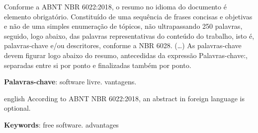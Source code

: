 \documentclass[
	article,			%
	12pt,				%
	oneside,			%
	a4paper,			%
	english,			%
	brazil,				%
	sumario=tradicional
	]{abntex2}
\begin{document}

\frenchspacing 


%
%

\imprimircapa


\imprimirfolhaderosto*





\begin{resumoumacoluna}
 Conforme a ABNT NBR 6022:2018, o resumo no idioma do documento é elemento obrigatório. 
 Constituído de uma sequência de frases concisas e objetivas e não de uma 
 simples enumeração de tópicos, não ultrapassando 250 palavras, seguido, logo 
 abaixo, das palavras representativas do conteúdo do trabalho, isto é, 
 palavras-chave e/ou descritores, conforme a NBR 6028. (\ldots) As 
 palavras-chave devem figurar logo abaixo do resumo, antecedidas da expressão 
 Palavras-chave:, separadas entre si por ponto e finalizadas também por ponto.
 
 \vspace{\onelineskip}
 
 \noindent
 \textbf{Palavras-chave}: software livre. vantagens. 
\end{resumoumacoluna}


\renewcommand{\resumoname}{Abstract}
\begin{resumoumacoluna}
 \begin{otherlanguage*}{english}
   According to ABNT NBR 6022:2018, an abstract in foreign language is optional.

   \vspace{\onelineskip}
 
   \noindent
   \textbf{Keywords}: free software. advantages
 \end{otherlanguage*}  
\end{resumoumacoluna}


\cleardoublepage
{}
\tableofcontents*
\listoffigures
\listoftables
\cleardoublepage
\end{document}
